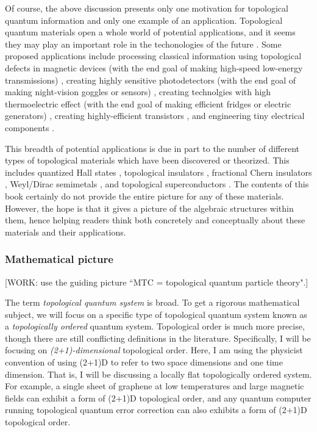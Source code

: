 Of course, the above discussion presents only one motivation for topological quantum information and only one example of an application. Topological quantum materials open a whole world of potential applications, and it seems they may play an important role in the techonologies of the future \cite{ramirez2020dawn}. Some proposed applications include processing classical information using topological defects in magnetic devices (with the end goal of making high-speed low-energy transmissions) \cite{marrows2021perspective, vsmejkal2018topological}, creating highly sensitive photodetectors (with the end goal of making night-vision goggles or sensors) \cite{chan2017photocurrents}, creating technolgies with high thermoelectric effect (with the end goal of making efficient fridges or electric generators) \cite{skinner2018large}, creating highly-efficient transistors \cite{fuhrer2021proposal}, and engineering tiny electrical components \cite{viola2014hall, placke2017model}. 

This breadth of potential applications is due in part to the number of different types of topological materials which have been discovered or theorized. This includes quantized Hall states \cite{von202040}, topological insulators \cite{hasan2010colloquium}, fractional Chern insulators \cite{regnault2011fractional}, Weyl/Dirac semimetals \cite{armitage2018weyl}, and topological superconductors \cite{sato2017topological}. The contents of this book certainly do not provide the entire picture for any of these materials. However, the hope is that it gives a picture of the algebraic structures within them, hence helping readers think both concretely and conceptually about these materials and their applications.

\subsubsection{Mathematical picture}


[WORK: use the guiding picture ``MTC = topological quantum particle theory".]

The term \textit{topological quantum system} is broad. To get a rigorous mathematical subject, we will focus on a specific type of topological quantum system known as a \textit{topologically ordered} quantum system. Topological order is much more precise, though there are still conflicting definitions in the literature. Specifically, I will be focusing on \textit{(2+1)-dimensional} topological order. Here, I am using the physicist convention of using (2+1)D to refer to two space dimensions and one time dimension. That is, I will be discussing a locally flat topologically ordered system. For example, a single sheet of graphene at low temperatures and large magnetic fields can exhibit a form of (2+1)D topological order, and any quantum computer running topological quantum error correction can also exhibits a form of (2+1)D topological order.

